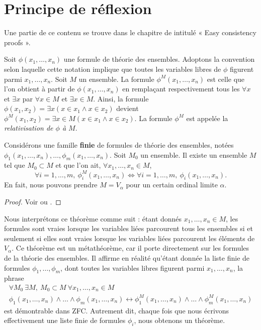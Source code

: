\section{Principe de réflexion}
\label{section-reflection-principle}

\noindent
Une partie de ce contenu se trouve dans le chapitre de \cite{Kunen} intitulé
« Easy consistency proofs ».

\medskip\noindent
Soit $\phi(x_1, \ldots, x_n)$ une formule de théorie des ensembles. Adoptons la
convention selon laquelle cette notation implique que toutes les variables
libres de $\phi$ figurent parmi $x_1, \ldots, x_n$. Soit $M$ un ensemble. La
formule $\phi^M(x_1, \ldots, x_n)$ est celle que l'on obtient à partir de
$\phi(x_1, \ldots, x_n)$ en remplaçant respectivement tous les $\forall x$ et
$\exists x$ par $\forall x\in M$ et $\exists x\in M$. Ainsi, la formule
$\phi(x_1, x_2) = \exists x (x\in x_1 \wedge x\in x_2)$ devient
$\phi^M(x_1, x_2) = \exists x \in M (x\in x_1 \wedge x\in x_2)$.
La formule $\phi^M$ est appelée la {\it relativisation de $\phi$ à $M$}.

\begin{theorem}
\label{theorem-reflection-principle}
Considérons une famille {\bf finie} de formules de théorie des ensembles,
notées $\phi_1(x_1, \ldots, x_n), \ldots, \phi_m(x_1, \ldots, x_n)$.
Soit $M_0$ un ensemble. Il existe un ensemble $M$ tel
que $M_0 \subset M$ et que l'on ait, $\forall x_1, \ldots, x_n \in M$,
$$
\forall i = 1, \ldots, m, \ \phi_i^{M}(x_1, \ldots, x_n)
\Leftrightarrow
\forall i = 1, \ldots, m, \ \phi_i(x_1, \ldots, x_n).
$$
En fait, nous pouvons prendre $M = V_\alpha$ pour un certain ordinal limite
$\alpha$.
\end{theorem}

\begin{proof}
Voir \cite[théorème 12.14]{Jech} ou \cite[théorème 7.4]{Kunen}.
\end{proof}

\noindent
Nous interprétons ce théorème comme suit : étant donnés
$x_1, \ldots, x_n \in M$, les formules sont vraies lorsque les variables liées
parcourent tous les ensembles si et seulement si elles sont vraies lorsque les
variables liées parcourent les éléments de $V_\alpha$. Ce théorème est un
métathéorème, car il porte directement sur les formules de la théorie des
ensembles. Il affirme en réalité qu'étant donnée la liste finie de formules
$\phi_1, \ldots, \phi_m$, dont toutes les variables libres figurent parmi
$x_1, \ldots, x_n$, la phrase
$$
\begin{matrix}
\forall M_0\ \exists M, \ M_0 \subset M\ \forall x_1, \ldots, x_n \in M \\
\phi_1(x_1, \ldots, x_n) \wedge \ldots \wedge \phi_m(x_1, \ldots, x_n)
\leftrightarrow
\phi_1^M(x_1, \ldots, x_n) \wedge \ldots \wedge \phi_m^M(x_1, \ldots, x_n)
\end{matrix}
$$
est démontrable dans ZFC. Autrement dit, chaque fois que nous écrivons
effectivement une liste finie de formules $\phi_i$, nous obtenons un théorème.

